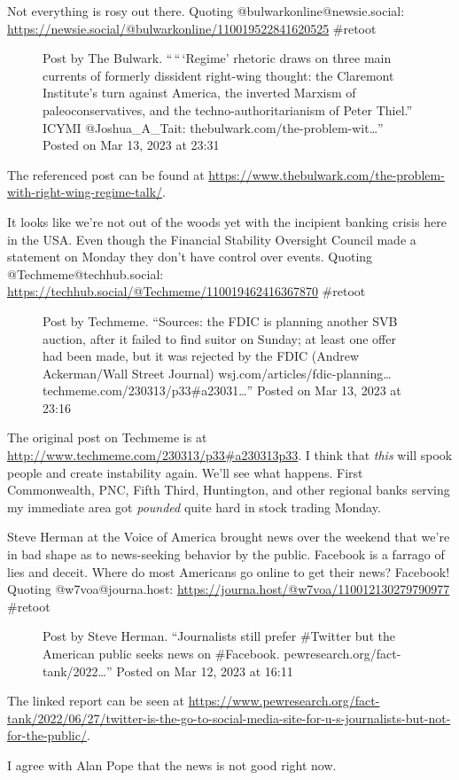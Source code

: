 Not everything is rosy out there. Quoting @bulwarkonline@newsie.social:
\url{https://newsie.social/@bulwarkonline/110019522841620525} \#retoot

\begin{figure}
\centering
{}
\caption{Post by The Bulwark. ``\,``\,`Regime' rhetoric draws on three
main currents of formerly dissident right-wing thought: the Claremont
Institute's turn against America, the inverted Marxism of
paleoconservatives, and the techno-authoritarianism of Peter Thiel.''
ICYMI @Joshua\_A\_Tait: thebulwark.com/the-problem-wit\ldots'' Posted on
Mar 13, 2023 at 23:31}
\end{figure}

The referenced post can be found at
\url{https://www.thebulwark.com/the-problem-with-right-wing-regime-talk/}.

It looks like we're not out of the woods yet with the incipient banking
crisis here in the USA. Even though the Financial Stability Oversight
Council made a statement on Monday they don't have control over events.
Quoting @Techmeme@techhub.social:
\url{https://techhub.social/@Techmeme/110019462416367870} \#retoot

\begin{figure}
\centering
{}
\caption{Post by Techmeme. ``Sources: the FDIC is planning another SVB
auction, after it failed to find suitor on Sunday; at least one offer
had been made, but it was rejected by the FDIC (Andrew Ackerman/Wall
Street Journal) wsj.com/articles/fdic-planning\ldots{}
techmeme.com/230313/p33\#a23031\ldots{}'' Posted on Mar 13, 2023 at
23:16}
\end{figure}

The original post on Techmeme is at
\url{http://www.techmeme.com/230313/p33\#a230313p33}. I think that
\emph{this} will spook people and create instability again. We'll see
what happens. First Commonwealth, PNC, Fifth Third, Huntington, and
other regional banks serving my immediate area got \emph{pounded} quite
hard in stock trading Monday.

Steve Herman at the Voice of America brought news over the weekend that
we're in bad shape as to news-seeking behavior by the public. Facebook
is a farrago of lies and deceit. Where do most Americans go online to
get their news? Facebook! Quoting @w7voa@journa.host:
\url{https://journa.host/@w7voa/110012130279790977} \#retoot

\begin{figure}
\centering
{}
\caption{Post by Steve Herman. ``Journalists still prefer \#Twitter but
the American public seeks news on \#Facebook.
pewresearch.org/fact-tank/2022\ldots{}'' Posted on Mar 12, 2023 at
16:11}
\end{figure}

The linked report can be seen at
\url{https://www.pewresearch.org/fact-tank/2022/06/27/twitter-is-the-go-to-social-media-site-for-u-s-journalists-but-not-for-the-public/}.

I agree with Alan Pope that the news is not good right now.
